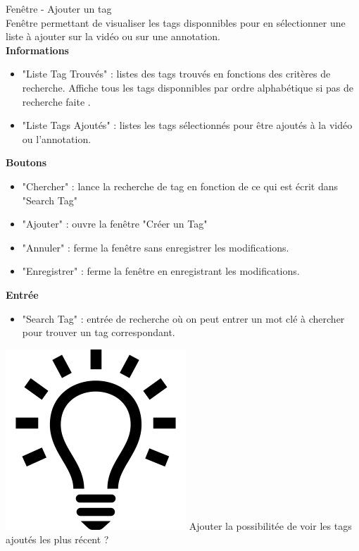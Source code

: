 \documentclass[11pt,french,a4paper]{report}
\begin{document}
\Large Fenêtre - Ajouter un tag\normalsize \\
    Fenêtre permettant de visualiser les tags disponnibles pour en sélectionner une liste à ajouter sur la vidéo
    ou sur une annotation. \\
\large \textbf{Informations}\normalsize
    \begin{itemize}[label=, leftmargin=*,parsep=0cm,itemsep=0cm,topsep=0cm]
        \item "Liste Tag Trouvés" : listes des tags trouvés en fonctions des critères de recherche.
        Affiche tous les tags disponnibles par ordre alphabétique si pas de recherche faite .
        \item "Liste Tags Ajoutés" : listes les tags sélectionnés pour être ajoutés à la vidéo ou l'annotation.
    \end{itemize}
\large \textbf{Boutons} \normalsize
    \begin{itemize}[label=, leftmargin=*,parsep=0cm,itemsep=0cm,topsep=0cm]
        \item "Chercher" : lance la recherche de tag en fonction de ce qui est écrit dans "Search Tag"
        \item "Ajouter" : ouvre la fenêtre  "Créer un Tag"
        \item "Annuler" :  ferme la fenêtre sans enregistrer les modifications.
        \item "Enregistrer" : ferme la fenêtre en enregistrant les modifications.
    \end{itemize}
\large \textbf{Entrée}\normalsize
    \begin{itemize}[label=, leftmargin=*,parsep=0cm,itemsep=0cm,topsep=0cm]
        \item "Search Tag" : entrée de recherche où on peut entrer un mot clé à chercher pour trouver un tag correspondant.
    \end{itemize}
    \includegraphics[scale=0.05]{../images/logo/logo_ampoule} Ajouter la possibilitée de voir les tags ajoutés 
            les plus récent ? \\ 
\end{document}
